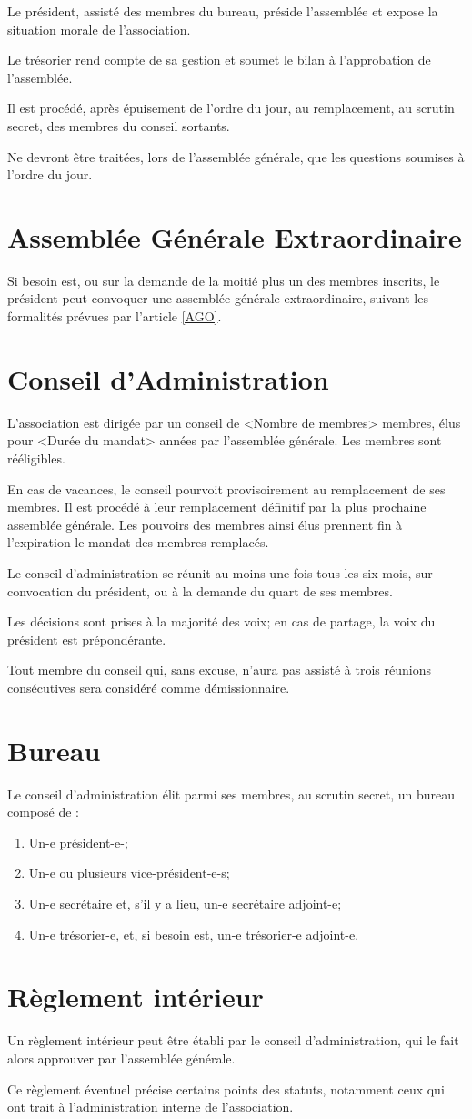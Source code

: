 \documentclass[12pt]{constitution}
\begin{document}
\medskip
Le président, assisté des membres du bureau, préside l'assemblée et expose la situation morale de l’association.

Le trésorier rend compte de sa gestion et soumet le bilan à l’approbation de l’assemblée.

Il est procédé, après épuisement de l’ordre du jour, au remplacement, au scrutin secret, des membres du conseil sortants.

\medskip
Ne devront être traitées, lors de l’assemblée générale, que les questions soumises à l’ordre du jour.

\section{Assemblée Générale Extraordinaire}
Si besoin est, ou sur la demande de la moitié plus un des membres inscrits, le président peut convoquer une assemblée générale extraordinaire, suivant les formalités prévues par l’article \ref{AGO}.

\section{Conseil d'Administration}
L'association est dirigée par un conseil de <Nombre de membres> membres, élus pour <Durée du mandat> années par l'assemblée générale. Les membres sont rééligibles.

En cas de vacances, le conseil pourvoit provisoirement au remplacement de ses membres. Il est procédé à leur remplacement définitif par la plus prochaine assemblée générale. Les pouvoirs des membres ainsi élus prennent fin à l'expiration le mandat des membres remplacés.

\medskip
Le conseil d'administration se réunit au moins une fois tous les six mois, sur convocation du président, ou à la demande du quart de ses membres.

Les décisions sont prises à la majorité des voix; en cas de partage, la voix du président est prépondérante. 

\medskip
Tout membre du conseil qui, sans excuse, n'aura pas assisté à trois réunions consécutives sera considéré comme démissionnaire. 

\section{Bureau}
Le conseil d'administration élit parmi ses membres, au scrutin secret, un bureau composé de :
\begin{enumerate}
	\item Un-e président-e-;
	\item Un-e ou plusieurs vice-président-e-s;
	\item Un-e secrétaire et, s'il y a lieu, un-e secrétaire adjoint-e;
	\item Un-e trésorier-e, et, si besoin est, un-e trésorier-e adjoint-e. 
\end{enumerate}

\section{Règlement intérieur}
Un règlement intérieur peut être établi par le conseil d’administration, qui le fait alors approuver par l’assemblée générale.

Ce règlement éventuel précise certains points des statuts, notamment ceux qui ont trait à l’administration interne de l’association.
\end{document}
